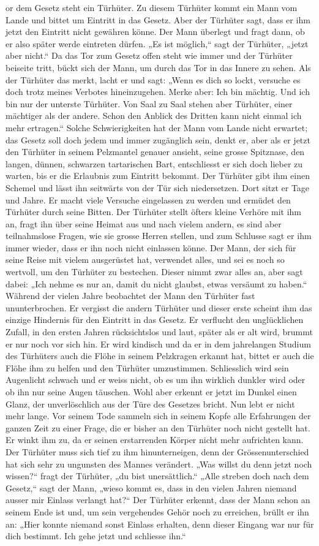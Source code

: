 \raisebox{-0.4ex}{\huge V}or dem Gesetz steht ein Türhüter. Zu diesem Türhüter kommt ein Mann vom Lande und bittet um Eintritt in das Gesetz. Aber der Türhüter sagt, dass er ihm jetzt den Eintritt nicht gewähren könne. Der Mann überlegt und fragt dann, ob er also später werde eintreten dürfen. „Es ist möglich,“ sagt der Türhüter, „jetzt aber nicht.“ Da das Tor zum Gesetz offen steht wie immer und der Türhüter beiseite tritt, bückt sich der Mann, um durch das Tor in das Innere zu sehen. Als der Türhüter das merkt, lacht er und sagt: „Wenn es dich so lockt, versuche es doch trotz meines Verbotes hineinzugehen. Merke aber: Ich bin mächtig. Und ich bin nur der unterste Türhüter. Von Saal zu Saal stehen aber Türhüter, einer mächtiger als der andere. Schon den Anblick des Dritten kann nicht einmal ich mehr ertragen.“ Solche Schwierigkeiten hat der Mann vom Lande nicht erwartet; das Gesetz soll doch jedem und immer zugänglich sein, denkt er, aber als er jetzt den Türhüter in seinem Pelzmantel genauer ansieht, seine grosse Spitznase, den langen, dünnen, schwarzen tartarischen Bart, entschliesst er sich doch lieber zu warten, bis er die Erlaubnis zum Eintritt bekommt. Der Türhüter gibt ihm einen Schemel und lässt ihn seitwärts von der Tür sich niedersetzen. Dort sitzt er Tage und Jahre. Er macht viele Versuche eingelassen zu werden und ermüdet den Türhüter durch seine Bitten. Der Türhüter stellt öfters kleine Verhöre mit ihm an, fragt ihn über seine Heimat aus und nach vielem andern, es sind aber teilnahmslose Fragen, wie sie grosse Herren stellen, und zum Schlusse sagt er ihm immer wieder, dass er ihn noch nicht einlassen könne. Der Mann, der sich für seine Reise mit vielem ausgerüstet hat, verwendet alles, und sei es noch so wertvoll, um den Türhüter zu bestechen. Dieser nimmt zwar alles an, aber sagt dabei: „Ich nehme es nur an, damit du nicht glaubst, etwas versäumt zu haben.“ Während der vielen Jahre beobachtet der Mann den Türhüter fast ununterbrochen. Er vergisst die andern Türhüter und dieser erste scheint ihm das einzige Hindernis für den Eintritt in das Gesetz. Er verflucht den unglücklichen Zufall, in den ersten Jahren rücksichtslos und laut, später als er alt wird, brummt er nur noch vor sich hin. Er wird kindisch und da er in dem jahrelangen Studium des Türhüters auch die Flöhe in seinem Pelzkragen erkannt hat, bittet er auch die Flöhe ihm zu helfen und den Türhüter umzustimmen. Schliesslich wird sein Augenlicht schwach und er weiss nicht, ob es um ihn wirklich dunkler wird oder ob ihn nur seine Augen täuschen. Wohl aber erkennt er jetzt im Dunkel einen Glanz, der unverlöschlich aus der Türe des Gesetzes bricht. Nun lebt er nicht mehr lange. Vor seinem Tode sammeln sich in seinem Kopfe alle Erfahrungen der ganzen Zeit zu einer Frage, die er bisher an den Türhüter noch nicht gestellt hat. Er winkt ihm zu, da er seinen erstarrenden Körper nicht mehr aufrichten kann. Der Türhüter muss sich tief zu ihm hinunterneigen, denn der Grössenunterschied hat sich sehr zu ungunsten des Mannes verändert. „Was willst du denn jetzt noch wissen?“ fragt der Türhüter, „du bist unersättlich.“ „Alle streben doch nach dem Gesetz,“ sagt der Mann, „wieso kommt es, dass in den vielen Jahren niemand ausser mir Einlass verlangt hat?“ Der Türhüter erkennt, dass der Mann schon an seinem Ende ist und, um sein vergehendes Gehör noch zu erreichen, brüllt er ihn an: „Hier konnte niemand sonst Einlass erhalten, denn dieser Eingang war nur für dich bestimmt. Ich gehe jetzt und schliesse ihn.“
